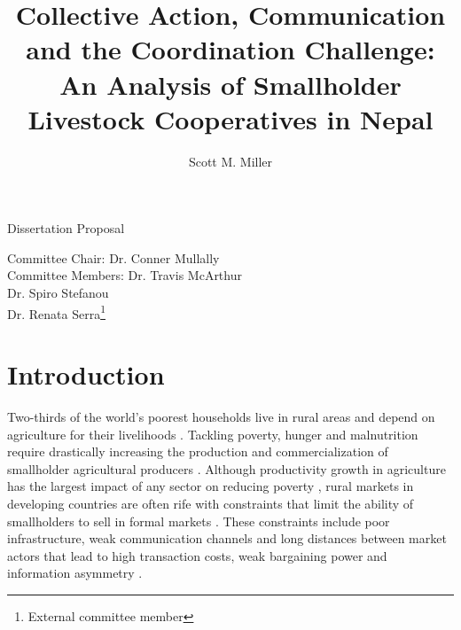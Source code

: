 \documentclass[11pt]{article}
\begin{document}



\title{Collective Action, Communication and the Coordination Challenge: An Analysis of Smallholder Livestock Cooperatives in Nepal \vspace{1cm}}

\author{Scott M. Miller}
\date{}

\sloppy
\maketitle

\begin{center}
    \large{Dissertation Proposal}
\end{center}

\vspace{2cm}

Committee Chair: Dr. Conner Mullally \\

Committee Members: Dr. Travis McArthur \\

\hspace{1.45in} Dr. Spiro Stefanou \\

\hspace{1.45in} Dr. Renata Serra\footnote{External committee member} \\




%

\clearpage
\renewcommand{\cftsecleader}{\cftdotfill{\cftdotsep}}

\tableofcontents
\clearpage

\doublespacing
\thispagestyle{plain}
\setcounter{page}{1}

\section{Introduction} \label{sec:intro}
Two-thirds of the world's poorest households live in rural areas and depend on agriculture for their livelihoods \citep{fugile-et.al.19}. Tackling poverty, hunger and malnutrition require drastically increasing the production and commercialization of smallholder agricultural producers \citep{fisher-qaim12,worldbank08}. Although productivity growth in agriculture has the largest impact of any sector on reducing poverty \citep{fugile-et.al.19}, rural markets in developing countries are often rife with constraints that limit the ability of smallholders to sell in formal markets \citep{ashby-et.al.09,kristjanson-et.al.14}. These constraints include poor infrastructure, weak communication channels and long distances between market actors that lead to high transaction costs, weak bargaining power and information asymmetry \citep{aker10,barrett.08,key.et.al.00,staal-et.al.97}. 
\end{document}
